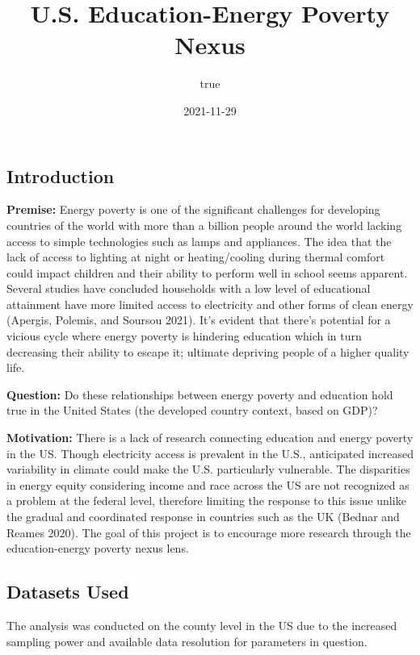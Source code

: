 \documentclass[
]{article}
\title{U.S. Education-Energy Poverty Nexus}
\author{true}
\date{2021-11-29}
\begin{document}
\maketitle

\hypertarget{introduction}{%
\subsection{Introduction}\label{introduction}}

\textbf{Premise:} Energy poverty is one of the significant challenges
for developing countries of the world with more than a billion people
around the world lacking access to simple technologies such as lamps and
appliances. The idea that the lack of access to lighting at night or
heating/cooling during thermal comfort could impact children and their
ability to perform well in school seems apparent. Several studies have
concluded households with a low level of educational attainment have
more limited access to electricity and other forms of clean energy
(Apergis, Polemis, and Soursou 2021). It's evident that there's
potential for a vicious cycle where energy poverty is hindering
education which in turn decreasing their ability to escape it; ultimate
depriving people of a higher quality life.

\textbf{Question:} Do these relationships between energy poverty and
education hold true in the United States (the developed country context,
based on GDP)?

\textbf{Motivation:} There is a lack of research connecting education
and energy poverty in the US. Though electricity access is prevalent in
the U.S., anticipated increased variability in climate could make the
U.S. particularly vulnerable. The disparities in energy equity
considering income and race across the US are not recognized as a
problem at the federal level, therefore limiting the response to this
issue unlike the gradual and coordinated response in countries such as
the UK (Bednar and Reames 2020). The goal of this project is to
encourage more research through the education-energy poverty nexus lens.

\hypertarget{datasets-used}{%
\subsection{Datasets Used}\label{datasets-used}}

The analysis was conducted on the county level in the US due to the
increased sampling power and available data resolution for parameters in
question.
\end{document}
